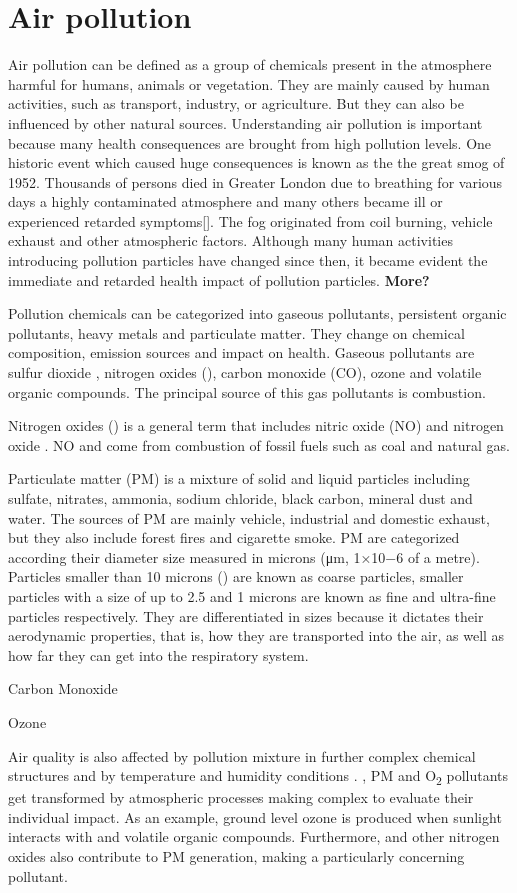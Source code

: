 \section{Air pollution}
Air pollution can be defined as a group of chemicals present in the atmosphere harmful for humans, animals or vegetation. They are mainly caused by human activities, such as transport, industry, or agriculture. But they can also be influenced by other natural sources. Understanding air pollution is important because many health consequences are brought from high pollution levels. One historic event which caused huge consequences is known as the the great smog of 1952. Thousands of persons died in Greater London due to  breathing for various days a highly contaminated atmosphere and many others became ill or experienced retarded symptoms[]. The fog originated from coil burning, vehicle exhaust and other atmospheric factors. Although many human activities introducing pollution particles have changed since then, it became evident the immediate and retarded health impact of pollution particles. \textbf{More?}

Pollution chemicals can be categorized into gaseous pollutants, persistent organic pollutants, heavy metals and particulate matter. They change on chemical composition, emission sources and impact on health. Gaseous pollutants are sulfur dioxide \SOTWO, nitrogen oxides (\NOX), carbon monoxide (CO), ozone \OTHREE and volatile organic compounds. The principal source of this gas pollutants is combustion. 

Nitrogen oxides (\NOX) is a general term that includes nitric oxide (NO) and nitrogen oxide \NOTWO. NO and \NOTWO come from combustion of fossil fuels such as coal and natural gas.

Particulate matter (PM) is a mixture of solid and liquid particles including sulfate, nitrates, ammonia, sodium chloride, black carbon, mineral dust and water. The sources of PM are mainly vehicle, industrial and domestic exhaust, but they also include forest fires and cigarette smoke. PM are categorized according their diameter size measured in microns (μm, 1×10−6 of a metre). Particles smaller than 10 microns (\PMTEN) are known as coarse particles, smaller particles with a size of up to 2.5  and 1 microns are known as fine and ultra-fine particles respectively. They are differentiated in sizes because it dictates their aerodynamic properties, that is, how they are transported into the air, as well as how far they can get into the respiratory system.

Carbon Monoxide

Ozone 

Air quality is also affected by pollution mixture in further complex chemical structures and by temperature and humidity conditions . \NOTWO, PM and O\textsubscript{2}  pollutants get transformed by atmospheric processes making complex to evaluate their individual impact. As an example, ground level ozone is produced when sunlight interacts with \NOTWO and volatile organic compounds. Furthermore, \NOTWO and other nitrogen oxides also contribute to PM generation, making \NOX a particularly concerning pollutant.
